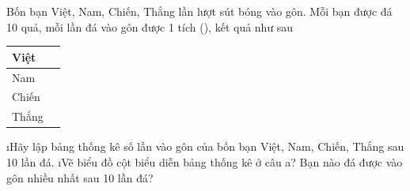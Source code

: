 \begin{vd}
	Bốn bạn Việt, Nam, Chiến, Thắng lần lượt sút bóng vào gôn. Mỗi bạn được đá  10 quả, mỗi lần đá vào gôn được 1 tích (), kết quả như sau
	\begin{center}
		\begin{tabular}{|l|l|}
			\hline
			Việt & \checkmark\checkmark\checkmark\checkmark\checkmark\\
			\hline
			Nam	& \checkmark\checkmark\checkmark\checkmark\checkmark\checkmark\checkmark\\
			\hline
			Chiến & \checkmark\checkmark\checkmark\checkmark\\
			\hline
			Thắng & \checkmark\checkmark\checkmark\checkmark\checkmark\checkmark\checkmark\checkmark\\
			\hline
		\end{tabular}
	\end{center}
	\begin{enumerate}[a),leftmargin=*]
		\i Hãy lập bảng thống kê số lần vào gôn của bốn bạn Việt, Nam, Chiến, Thắng  sau 10 lần đá.
		\i Vẽ biểu đồ cột biểu diễn bảng thống kê ở câu a? Bạn nào đá được vào gôn nhiều nhất sau 10 lần đá?
	\end{enumerate}
\end{vd}
